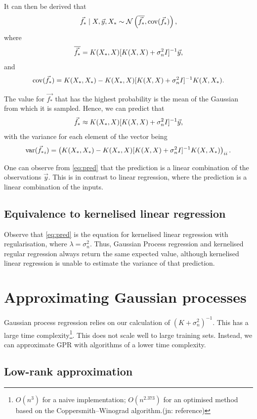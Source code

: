 \documentclass[11pt,twoside,openright]{report}
\newcommand\cN{\mathcal{N}}
\DeclareMathOperator{\var}{var}
\DeclareMathOperator{\cov}{cov}
\newcommand\jn[1]{{\color{red}(jn: #1)}}
\begin{document}
It can then be derived that \[
    \vec{f_*} \mid X, \vec{y}, X_* \sim \cN\left(\overline{\vec{f_*}}, \cov(\vec{f_*})\right)\text,
\] where \[
    \overline{\vec{f_*}} = K(X_*, X)[K(X, X) + \sigma_n^2I]^{-1}\vec{y}\text,
\] and \[
    \cov(\vec{f_*}) = K(X_*, X_*) - K(X_*, X)[K(X, X) + \sigma_n^2I]^{-1}K(X, X_*)\text.
\]

The value for $\vec{f_*}$ that has the highest probability is the mean of the Gaussian from which it is sampled. Hence, we can predict that \begin{equation}
    \label{eq:pred}
    \vec{f_*} \approx K(X_*, X)[K(X, X) + \sigma_n^2I]^{-1}\vec{y}\text,
\end{equation} with the variance for each element of the vector being\[
    \var(\vec{f_*}_i) = \left( K(X_*, X_*) - K(X_*, X)[K(X, X) + \sigma_n^2I]^{-1}K(X, X_*) \right)_{ii}\text.
\]

One can observe from \cref{eq:pred} that the prediction is a linear combination of the observations $\vec{y}$. This is in contrast to linear regression, where the prediction is a linear combination of the inputs.

\subsection{Equivalence to kernelised linear regression}

Observe that \cref{eq:pred} is the equation for kernelised linear regression with regularisation, where $\lambda=\sigma_n^2$. Thus, Gaussian Process regression and kernelised regular regression always return the same expected value, although kernelised linear regression is unable to estimate the variance of that prediction.

\section{Approximating Gaussian processes}

Gaussian process regression relies on our calculation of $(K+\sigma_n^2)^{-1}$. This has a large time complexity\footnote{$O(n^3)$ for a naive implementation; $O(n^{2.373})$ for an optimised method based on the Coppersmith–Winograd algorithm.\jn{reference}}. This does not scale well to large training sets. Instead, we can approximate GPR with algorithms of a lower time complexity.

\subsection{Low-rank approximation}
\end{document}
